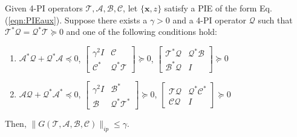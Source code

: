 \documentclass[10pt,a4paper]{amsart}
\newcommand{\mbf}[1]{\mathbf{#1}}
\newcommand{\mcl}[1]{\mathcal{#1}}
\newcommand{\norm}[1]{\lVert#1\rVert}
\begin{document}
\begin{theorem}\label{thm:Normnoncoercive}
    Given 4-PI operators ${\mathcal{T}, \mathcal{A},\mathcal{B},\mathcal{C}}$, let $\{\mbf x, z\}$ satisfy a PIE of the form Eq. (\ref{eqn:PIEaux}).
    Suppose there exists a $\gamma > 0$ and a 4-PI operator $\mcl Q$ such that $\mcl T^*\mcl Q =\mcl Q^* \mcl T \succeq 0$ and one of the following conditions hold:
    \begin{enumerate}
        \item[(i)] $\mcl A^*\mcl Q+\mcl Q^*\mcl A \!\preceq\! 0$, $ \begin{bmatrix}
            \gamma^2I & \mcl C\\ \mcl C^* & \mcl Q^* \mcl  T 
        \end{bmatrix}\!\succeq\! 0$, $ \begin{bmatrix}
            \mcl T^*\mcl Q & \mcl Q^* \mcl B\\ \mcl B^* \mcl Q & I
        \end{bmatrix}\!\succeq\! 0$ 
        \item[(ii)] $\mcl A\mcl Q+\mcl Q^*\mcl A^* \!\preceq\! 0$, $ \begin{bmatrix}
            \gamma^2I \!\!& \mcl B^*\\ \mcl B \!\!& \mcl Q^* \mcl  T^*
        \end{bmatrix}\!\succeq\! 0$, $ \begin{bmatrix}
            \mcl T\mcl Q & \mcl Q^* \mcl C^*\\ \mcl C \mcl Q & I
        \end{bmatrix}\!\succeq\! 0$ 
    \end{enumerate} 
    Then, $\norm{G(\mcl T, \mcl A,\mcl B,\mcl C)}_{ip} \le \gamma$.
\end{theorem}
\end{document}
